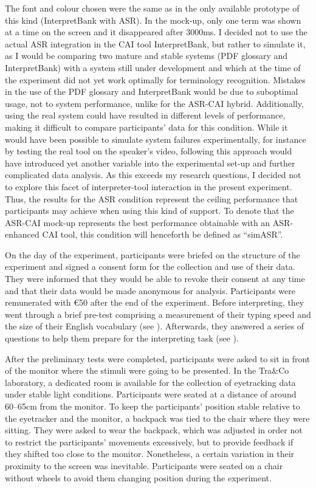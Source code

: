 The font and colour chosen were the same as in the only available prototype of this kind (InterpretBank with ASR). In the mock-up, only one term was shown at a time on the screen and it disappeared after 3000ms. I decided not to use the actual ASR integration in the CAI tool InterpretBank, but rather to simulate it, as I would be comparing two mature and stable systems (PDF glossary and InterpretBank) with a system still under development and which at the time of the experiment did not yet work optimally for terminology recognition. Mistakes in the use of the PDF glossary and InterpretBank would be due to suboptimal usage, not to system performance, unlike for the ASR-CAI hybrid. Additionally, using the real system could have resulted in different levels of performance, making it difficult to compare participants' data for this condition. While it would have been possible to simulate system failures experimentally, for instance by testing the real tool on the speaker's video, following this approach would have introduced yet another variable into the experimental set-up and further complicated data analysis. As this exceeds my research questions, I decided not to explore this facet of interpreter-tool interaction in the present experiment. Thus, the results for the ASR condition represent the ceiling performance that participants may achieve when using this kind of support. To denote that the ASR-CAI mock-up represents the best performance obtainable with an ASR-enhanced CAI tool, this condition will henceforth be defined as ``simASR''.

On the day of the experiment, participants were briefed on the structure of the experiment and signed a consent form for the collection and use of their data. They were informed that they would be able to revoke their consent at any time and that their data would be made anonymous for analysis. Participants were remunerated with \euro 50 after the end of the experiment. Before interpreting, they went through a brief pre-test comprising a measurement of their typing speed and the size of their English vocabulary (see ). Afterwards, they answered a series of questions to help them prepare for the interpreting task (see ).

After the preliminary tests were completed, participants were asked to sit in front of the monitor where the stimuli were going to be presented. In the Tra\&Co laboratory, a dedicated room is available for the collection of eyetracking data under stable light conditions. Participants were seated at a distance of around 60--65cm from the monitor. To keep the participants' position stable relative to the eyetracker and the monitor, a backpack was tied to the chair where they were sitting. They were asked to wear the backpack, which was adjusted in order not to restrict the participants' movements excessively, but to provide feedback if they shifted too close to the monitor. Nonetheless, a certain variation in their proximity to the screen was inevitable. Participants were seated on a chair without wheels to avoid them changing position during the experiment.

